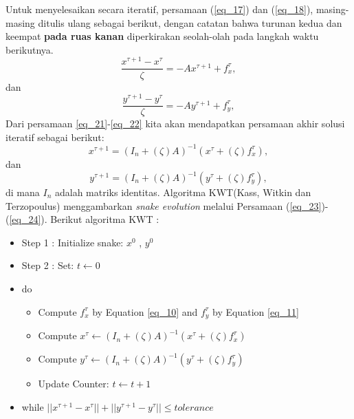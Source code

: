 Untuk menyelesaikan secara iteratif, persamaan (\ref{eq_17}) dan (\ref{eq_18}), masing-masing ditulis ulang sebagai berikut, dengan catatan bahwa turunan kedua dan keempat \textbf{pada ruas kanan} diperkirakan seolah-olah pada langkah waktu berikutnya\citep{ivins1995everything}.
\begin{equation}
\label{eq_21}
\dfrac{x^{\tau+1}-x^\tau}{\zeta} = -Ax^{\tau+1}+f^\tau_x,
\end{equation}
dan
\begin{equation}
\label{eq_22}
\dfrac{y^{\tau+1}-y^\tau}{\zeta} = -Ay^{\tau+1}+f^\tau_y,
\end{equation}
Dari persamaan \ref{eq_21}-\ref{eq_22} kita akan mendapatkan persamaan akhir solusi iteratif sebagai berikut:
\begin{equation}
\label{eq_23}
x^{\tau+1} = (I_n+(\zeta)A)^{-1}(x^\tau+(\zeta)f^\tau_x),
\end{equation}
dan
\begin{equation}
\label{eq_24}
y^{\tau+1} = (I_n+(\zeta)A)^{-1}(y^\tau+(\zeta)f^\tau_y),
\end{equation}
di mana $I_n$ adalah matriks identitas. Algoritma KWT(Kass, Witkin dan Terzopoulus) menggambarkan \emph{snake evolution} melalui Persamaan (\ref{eq_23})-(\ref{eq_24}). Berikut algoritma KWT :
\\
\begin{itemize}
	\item[] Step 1 : Initialize snake: $x^0$ , $y^0$
	\item[] Step 2 : Set: $ t \gets 0 $
	\item[] do
	\begin{itemize}
		\item[] Compute $f^\tau_x$ by Equation \ref{eq_10} and $f^\tau_y$ by Equation \ref{eq_11}
		\item[] Compute $x^\tau \gets (I_n+(\zeta)A)^{-1}(x^\tau+(\zeta)f^\tau_x)$
		\item[] Compute $y^\tau \gets (I_n+(\zeta)A)^{-1}(y^\tau+(\zeta)f^\tau_y)$
		\item[] Update Counter: $t \gets t+1$
	\end{itemize}
	\item[] while $ ||x^{\tau+1}-x^\tau|| + ||y^{\tau+1}-y^\tau|| \leq tolerance$
\end{itemize}

